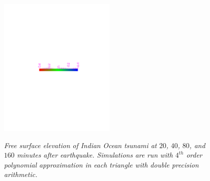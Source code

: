 \begin{figure}
\begin{center}
{\begin{minipage}[c]{0.35\linewidth}
  \end{minipage}}\\
  \centering
   \includegraphics[trim=6cm 11cm 5cm 10.5cm,clip=true,width=0.5\textwidth]{./figures/TsunamiLegend.pdf}
\end{center}
 \caption{\emph{Free surface elevation of Indian Ocean tsunami at $20$, $40$,
$80$, and $160$ minutes after earthquake. Simulations are run with $4^{th}$
order polynomial approximation in each triangle with double precision arithmetic.}}
  \label{fig:tsunami_propagation}
\end{figure}

